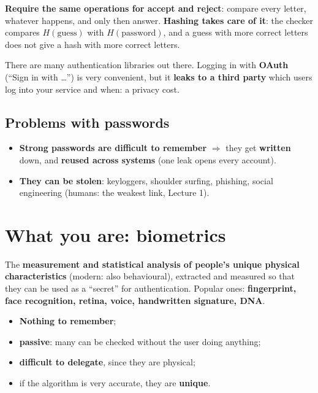 \begin{propbox}[title={Option 2: always check everything}]
\textbf{Require the same operations for accept and reject}: compare every letter, whatever happens,
and only then answer. \textbf{Hashing takes care of it}: the checker compares $H(\text{guess})$ with
$H(\text{password})$, and a guess with more correct letters does not give a hash with more
correct letters.
\end{propbox}

\begin{rembox}[title={Do not program your own password checker}]
There are many authentication libraries out there. Logging in with \textbf{OAuth} (``Sign in
with \ldots'') is very convenient, but it \textbf{leaks to a third party} which users log into your
service and when: a privacy cost.
\end{rembox}

\subsection{Problems with passwords}

\begin{warnbox}[title=Problems with passwords]
\begin{itemize}
  \item \textbf{Strong passwords are difficult to remember} $\Rightarrow$ they get
        \textbf{written} down, and \textbf{reused across systems} (one leak opens every account).
  \item \textbf{They can be stolen}: keyloggers, shoulder surfing, phishing, social engineering
        (humans: the weakest link, Lecture 1).
\end{itemize}
\end{warnbox}

\section{What you are: biometrics}

\begin{defnbox}[title=Biometrics]
The \textbf{measurement and statistical analysis of people's unique physical characteristics}
(modern: also behavioural), extracted and measured so that they can be used as a ``secret'' for
authentication. Popular ones: \textbf{fingerprint, face recognition, retina, voice, handwritten
signature, DNA}.
\end{defnbox}

\begin{propbox}[title=Advantages]
\begin{itemize}
  \item \textbf{Nothing to remember};
  \item \textbf{passive}: many can be checked without the user doing anything;
  \item \textbf{difficult to delegate}, since they are physical;
  \item if the algorithm is very accurate, they are \textbf{unique}.
\end{itemize}
\end{propbox}

